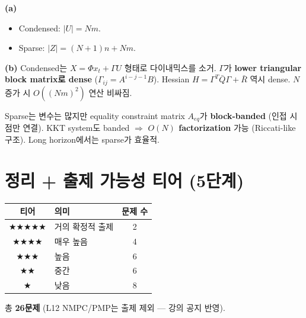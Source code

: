 \documentclass[11pt,a4paper]{article}
\begin{document}
\begin{sol}
\textbf{(a)}
\begin{itemize}
  \item Condensed: $|U| = Nm$.
  \item Sparse: $|Z| = (N+1)n + Nm$.
\end{itemize}

\textbf{(b)} Condensed는 $X = \Phi x_t + \Gamma U$ 형태로 다이내믹스를 소거. $\Gamma$가 \textbf{lower triangular block matrix로 dense} ($\Gamma_{ij} = A^{i-j-1}B$). Hessian $H = \Gamma^T \bar Q \Gamma + \bar R$ 역시 dense. $N$ 증가 시 $O((Nm)^2)$ 연산 비싸짐.

Sparse는 변수는 많지만 equality constraint matrix $A_{eq}$가 \textbf{block-banded} (인접 시점만 연결). KKT system도 banded $\Rightarrow$ \textbf{$O(N)$ factorization} 가능 (Riccati-like 구조). Long horizon에서는 sparse가 효율적.
\end{sol}


\section*{정리 + 출제 가능성 티어 (5단계)}

\begin{center}
\begin{tabular}{cl c}
\toprule
티어 & 의미 & 문제 수 \\
\midrule
★★★★★ & 거의 확정적 출제 & 2 \\
★★★★  & 매우 높음        & 4 \\
★★★   & 높음              & 6 \\
★★    & 중간              & 6 \\
★     & 낮음              & 8 \\
\bottomrule
\end{tabular}
\end{center}

총 \textbf{26문제} (L12 NMPC/PMP는 출제 제외 --- 강의 공지 반영).
\end{document}
